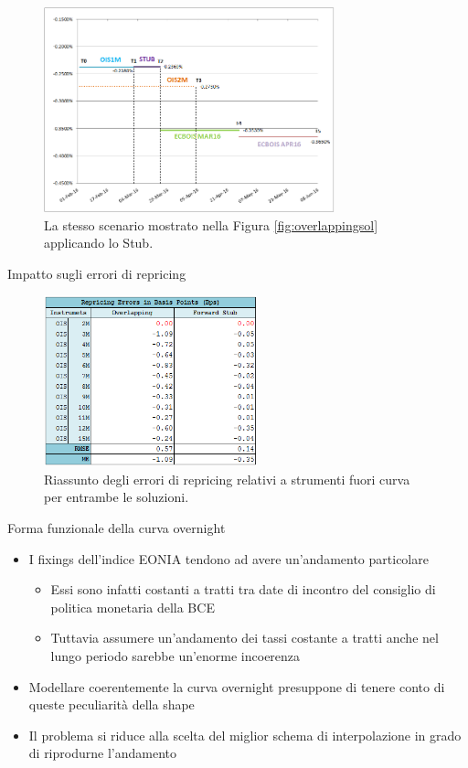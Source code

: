 \begin{tframe}
\begin{figure}[!h]
\centering
\includegraphics[width=0.75\textwidth]{stubsol.png}
\caption{La stesso scenario mostrato nella Figura \ref{fig:overlappingsol} applicando lo Stub.}
\label{fig:stubsol}
\end{figure}
\end{tframe}
\begin{tframe}{Impatto sugli errori di repricing}
\begin{figure}[!h]
\centering
\includegraphics[width=0.55\textwidth]{errors.png}
\caption{Riassunto degli errori di repricing relativi a strumenti fuori curva per entrambe le soluzioni.}
\label{fig:errors}
\end{figure}
\end{tframe}
\begin{tframe}{Forma funzionale della curva overnight}
\begin{itemize}
\item I fixings dell'indice EONIA tendono ad avere un'andamento particolare
   \begin{itemize}
   \item Essi sono infatti costanti a tratti tra date di incontro del consiglio di politica monetaria della BCE
   \item Tuttavia assumere un'andamento dei tassi costante a tratti anche nel lungo periodo sarebbe un'enorme incoerenza
   \end{itemize}
\item Modellare coerentemente la curva overnight presuppone di tenere conto di queste peculiarità della shape
\item Il problema si riduce alla scelta del miglior schema di interpolazione in grado di riprodurne l'andamento
\end{itemize}
\end{tframe}
